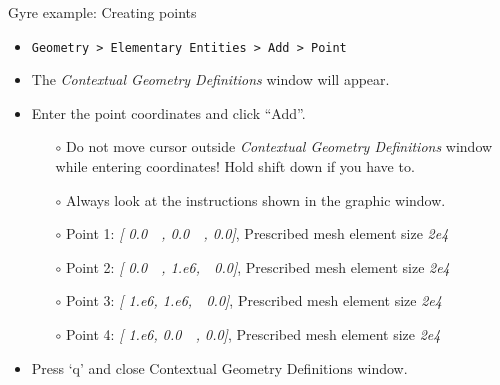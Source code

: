 \documentclass[t]{beamer}
\begin{document}
\begin{frame}{Gyre example: Creating points}
  \begin{itemize}
  \item \lstinline{Geometry > Elementary Entities > Add > Point}\\[4pt]
  \item The \emph{Contextual Geometry Definitions} window will appear.\\[4pt]
  \item Enter the point coordinates and click ``Add''.\\[4pt]
  \begin{itemize}
    \item[$\circ$] Do not move cursor outside \emph{Contextual Geometry Definitions} window while entering coordinates! Hold shift down if you have to.\\[4pt]
    \item[$\circ$] Always look at the instructions shown in the graphic window.\\[4pt]
    \item[$\circ$] Point 1: \emph{[ 0.0\ \ ,  0.0\ \ ,  0.0]}, Prescribed mesh element size \emph{2e4}\\[5pt]
    \item[$\circ$] Point 2: \emph{[ 0.0\ \ ,  1.e6,\ \ 0.0]}, Prescribed mesh element size \emph{2e4}\\[5pt]
    \item[$\circ$] Point 3: \emph{[ 1.e6, 1.e6,\ \ 0.0]}, Prescribed mesh element size \emph{2e4}\\[5pt]
    \item[$\circ$] Point 4: \emph{[ 1.e6, 0.0\ \ ,  0.0]}, Prescribed mesh element size \emph{2e4}\\[5pt]
    \end{itemize}
  \item Press `q' and close Contextual Geometry Definitions window.
  \end{itemize}
\end{frame}
\end{document}
